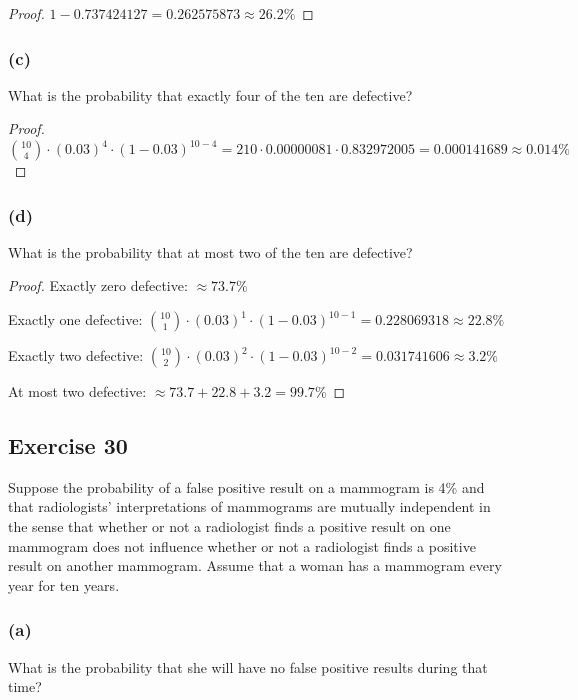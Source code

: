 \documentclass[14pt]{extarticle}
\begin{document}
\begin{proof}
     \(1 - 0.737424127 = 0.262575873 \approx 26.2\%\)
\end{proof}

\subsubsection{(c)}
What is the probability that exactly four of the ten are defective?

\begin{proof}
     \(\binom{10}{4} \cdot (0.03)^4 \cdot (1 - 0.03)^{10-4} = 210 \cdot 0.00000081 \cdot 0.832972005 = 0.000141689 \approx
     0.014\%\)
\end{proof}

\subsubsection{(d)}
What is the probability that at most two of the ten are defective?

\begin{proof}
     Exactly zero defective: \(\approx 73.7\%\)

     Exactly one defective: \(\binom{10}{1} \cdot (0.03)^1 \cdot (1 - 0.03)^{10-1} = 0.228069318 \approx 22.8\%\)

     Exactly two defective: \(\binom{10}{2} \cdot (0.03)^2 \cdot (1 - 0.03)^{10-2} = 0.031741606 \approx 3.2\%\)

     At most two defective: \(\approx 73.7+22.8+3.2 = 99.7\%\)
\end{proof}

\subsection{Exercise 30}
Suppose the probability of a false positive result on a mammogram is 4\% and that radiologists’ interpretations of
mammograms are mutually independent in the sense that whether or not a radiologist finds a positive result on one mammogram
does not influence whether or not a radiologist finds a positive result on another mammogram. Assume that a woman has
a mammogram every year for ten years.

\subsubsection{(a)}
What is the probability that she will have no false positive results during that time?
\end{document}
